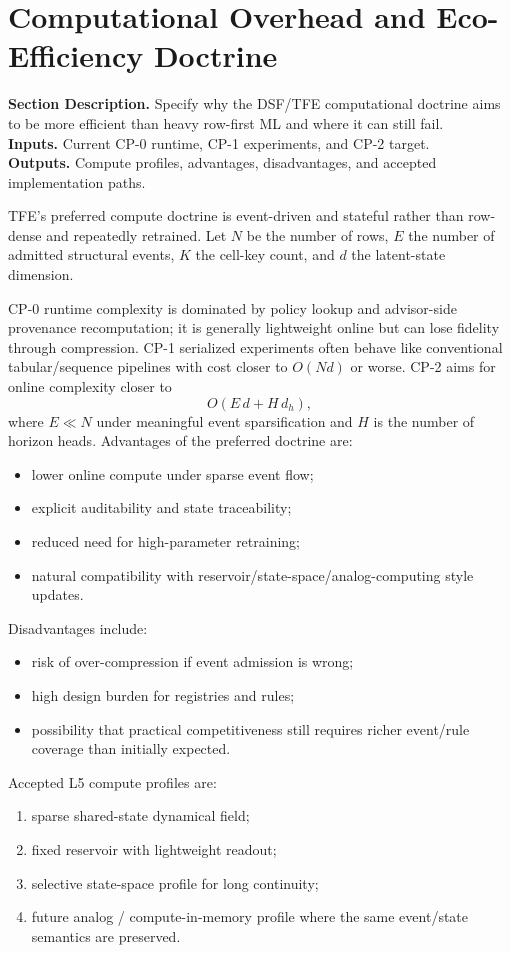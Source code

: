 \documentclass[11pt]{report}
\newcommand{\meta}[3]{\textbf{Section Description.} #1\\
\textbf{Inputs.} #2\\
\textbf{Outputs.} #3\par}
\begin{document}
\section{Computational Overhead and Eco-Efficiency Doctrine}
\meta{Specify why the DSF/TFE computational doctrine aims to be more efficient than heavy row-first ML and where it can still fail.}{Current CP-0 runtime, CP-1 experiments, and CP-2 target.}{Compute profiles, advantages, disadvantages, and accepted implementation paths.}

TFE's preferred compute doctrine is event-driven and stateful rather than row-dense and repeatedly retrained. Let $N$ be the number of rows, $E$ the number of admitted structural events, $K$ the cell-key count, and $d$ the latent-state dimension.

CP-0 runtime complexity is dominated by policy lookup and advisor-side provenance recomputation; it is generally lightweight online but can lose fidelity through compression. CP-1 serialized experiments often behave like conventional tabular/sequence pipelines with cost closer to $O(Nd)$ or worse. CP-2 aims for online complexity closer to
\[
O(E\,d + H\,d_h),
\]
where $E\ll N$ under meaningful event sparsification and $H$ is the number of horizon heads. Advantages of the preferred doctrine are:
\begin{itemize}
    \item lower online compute under sparse event flow;
    \item explicit auditability and state traceability;
    \item reduced need for high-parameter retraining;
    \item natural compatibility with reservoir/state-space/analog-computing style updates.
\end{itemize}
Disadvantages include:
\begin{itemize}
    \item risk of over-compression if event admission is wrong;
    \item high design burden for registries and rules;
    \item possibility that practical competitiveness still requires richer event/rule coverage than initially expected.
\end{itemize}
Accepted L5 compute profiles are:
\begin{enumerate}[leftmargin=1.2cm]
    \item sparse shared-state dynamical field;
    \item fixed reservoir with lightweight readout;
    \item selective state-space profile for long continuity;
    \item future analog / compute-in-memory profile where the same event/state semantics are preserved.
\end{enumerate}
\end{document}

